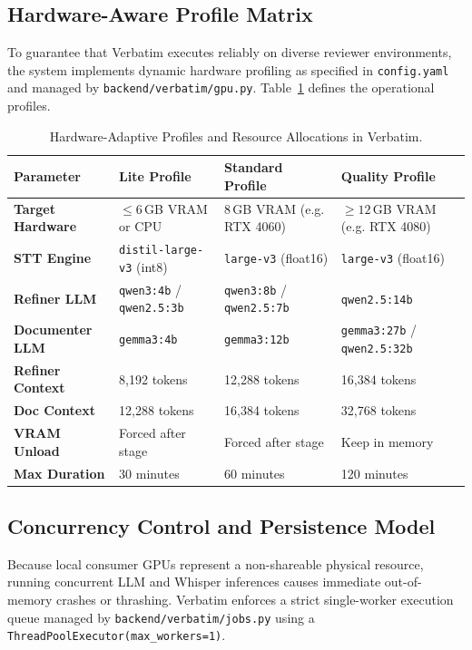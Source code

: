 \documentclass[10pt,a4paper]{article}
\begin{document}
\subsection{Hardware-Aware Profile Matrix}
To guarantee that Verbatim executes reliably on diverse reviewer environments, the system implements dynamic hardware profiling as specified in \texttt{config.yaml} and managed by \texttt{backend/verbatim/gpu.py}. Table~\ref{tab:hardware_profiles} defines the operational profiles.

\begin{table}[h]
\centering
\caption{Hardware-Adaptive Profiles and Resource Allocations in Verbatim.}
\label{tab:hardware_profiles}
\small
\begin{tabularx}{\columnwidth}{l X X X}
\toprule
\textbf{Parameter} & \textbf{Lite Profile} & \textbf{Standard Profile} & \textbf{Quality Profile} \\
\midrule
\textbf{Target Hardware} & $\le 6$\,GB VRAM or CPU & 8\,GB VRAM (e.g. RTX 4060) & $\ge 12$\,GB VRAM (e.g. RTX 4080) \\
\textbf{STT Engine} & \texttt{distil-large-v3} (int8) & \texttt{large-v3} (float16) & \texttt{large-v3} (float16) \\
\textbf{Refiner LLM} & \texttt{qwen3:4b} / \texttt{qwen2.5:3b} & \texttt{qwen3:8b} / \texttt{qwen2.5:7b} & \texttt{qwen2.5:14b} \\
\textbf{Documenter LLM} & \texttt{gemma3:4b} & \texttt{gemma3:12b} & \texttt{gemma3:27b} / \texttt{qwen2.5:32b} \\
\textbf{Refiner Context} & 8,192 tokens & 12,288 tokens & 16,384 tokens \\
\textbf{Doc Context} & 12,288 tokens & 16,384 tokens & 32,768 tokens \\
\textbf{VRAM Unload} & Forced after stage & Forced after stage & Keep in memory \\
\textbf{Max Duration} & 30 minutes & 60 minutes & 120 minutes \\
\bottomrule
\end{tabularx}
\end{table}

\subsection{Concurrency Control and Persistence Model}
Because local consumer GPUs represent a non-shareable physical resource, running concurrent LLM and Whisper inferences causes immediate out-of-memory crashes or thrashing. Verbatim enforces a strict single-worker execution queue managed by \texttt{backend/verbatim/jobs.py} using a \texttt{ThreadPoolExecutor(max\_workers=1)}. 
\end{document}
